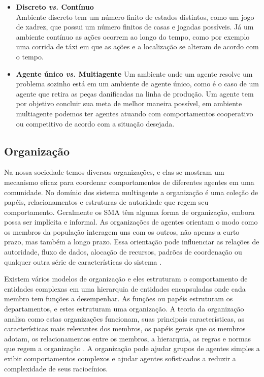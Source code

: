 \begin{itemize}
\item \textbf{Discreto \textit{vs.} Contínuo} \\
Ambiente discreto tem um número finito de estados distintos, como um jogo de xadrez, que possui um número finitos de casas e jogadas possíveis. Já um ambiente contínuo as ações ocorrem ao longo do tempo, como por exemplo uma corrida de táxi em que as ações e a localização se alteram de acordo com o tempo.

\item \textbf{Agente único \textit{vs.} Multiagente}
Um ambiente onde um agente resolve um problema sozinho está em um ambiente de agente único, como é o caso de um  agente que retira as peças danificadas na linha de produção. Um agente tem por objetivo concluir sua meta de melhor maneira possível, em ambiente multiagente podemos ter agentes atuando com comportamentos cooperativo ou competitivo de acordo com a situação desejada.
\end{itemize}

\subsection{Organização}\label{sec:orgsma}

  Na nossa sociedade temos diversas organizações, e elas se mostram um mecanismo eficaz para coordenar comportamentos de diferentes agentes em uma comunidade. No domínio dos sistema multiagente a organização é uma coleção de papéis, relacionamentos e estruturas de autoridade que regem seu comportamento. Geralmente os SMA têm alguma forma de organização, embora possa ser implícita e informal. As organizações de agentes orientam o modo como os membros da população interagem uns com os outros, não apenas a curto prazo, mas também a longo prazo. Essa orientação pode influenciar as relações de autoridade, fluxo de dados, alocação de recursos, padrões de coordenação ou qualquer outra série de características do sistema \cite{horling2004survey}.

Existem vários modelos de organização e eles estruturam o comportamento de entidades complexas em uma hierarquia de entidades encapsuladas onde cada membro tem funções a desempenhar. As funções ou papéis estruturam os departamentos, e estes estruturam uma organização. A teoria da organização analisa como estas organizações funcionam, suas principais características, as características mais relevantes dos membros, os papéis gerais que os membros adotam, os relacionamentos entre os membros, a hierarquia, as regras e normas que regem a organização \cite{argente2006multi}. A organização pode ajudar grupos de agentes simples a exibir comportamentos complexos e ajudar agentes sofisticados a reduzir a complexidade de seus raciocínios. %

